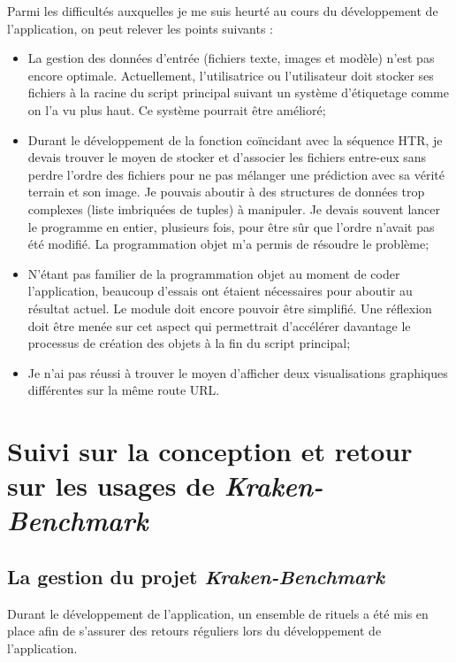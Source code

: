 Parmi les difficultés auxquelles je me suis heurté au cours du développement de l'application, on peut relever les points suivants :

\begin{itemize}
    \item La gestion des données d'entrée (fichiers texte, images et modèle) n'est pas encore optimale. Actuellement, l'utilisatrice ou l'utilisateur doit stocker ses fichiers à la racine du script principal suivant un système d'étiquetage comme on l'a vu plus haut. Ce système pourrait être amélioré;
    \item Durant le développement de la fonction coïncidant avec la séquence HTR, je devais trouver le moyen de stocker et d'associer les fichiers entre-eux sans perdre l'ordre des fichiers pour ne pas mélanger une prédiction avec sa vérité terrain et son image. Je pouvais aboutir à des structures de données trop complexes (liste imbriquées de tuples) à manipuler. Je devais souvent lancer le programme en entier, plusieurs fois, pour être sûr que l'ordre n'avait pas été modifié. La programmation objet m'a permis de résoudre le problème;
    \item N'étant pas familier de la programmation objet au moment de coder l'application, beaucoup d'essais ont étaient nécessaires pour aboutir au résultat actuel. Le module  doit encore pouvoir être simplifié. Une réflexion doit être menée sur cet aspect qui permettrait d'accélérer davantage le processus de création des objets à la fin du script principal;
    \item Je n'ai pas réussi à trouver le moyen d'afficher deux visualisations graphiques différentes sur la même route URL. 
\end{itemize}

\section{Suivi sur la conception et retour sur les usages de \textit{Kraken-Benchmark}}

\subsection{La gestion du projet \textit{Kraken-Benchmark}}\label{gestion_projet}

Durant le développement de l'application, un ensemble de rituels a été mis en place afin de s'assurer des retours réguliers lors du développement de l'application.\\

